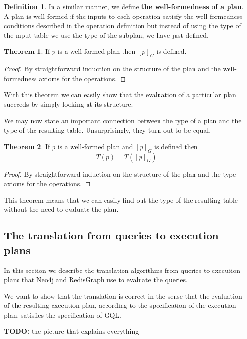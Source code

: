 \documentclass[14pt]{constructor-thesis}
\theoremstyle{definition}
\newtheorem{theorem}{Theorem}
\newtheorem{definition}{Definition}
\newcommand{\todo}[1]{
  \begin{tcolorbox}[colframe=red!75!black,colback=red!5!white,arc=0pt,fonttitle=\bfseries]
  \textbf{TODO:} #1
  \end{tcolorbox}
}
\begin{document}
\begin{definition}
  In a similar manner, we define \textbf{the well-formedness of a plan}. A plan is well-formed if the inputs to each operation satisfy the well-formedness conditions described in the operation definition but instead of using the type of the input table we use the type of the subplan, we have just defined.
\end{definition}

\begin{theorem}
  If $p$ is a well-formed plan then $[p]_G$ is defined.
\end{theorem}
\begin{proof}
  By straightforward induction on the structure of the plan and the well-formedness axioms for the operations.
\end{proof}

With this theorem we can easily show that the evaluation of a particular plan succeeds by simply looking at its structure.

We may now state an important connection between the type of a plan and the type of the resulting table. Unsurprisingly, they turn out to be equal.

\begin{theorem}
  If $p$ is a well-formed plan and $[p]_G$ is defined then
  $$T(p) = T([p]_G)$$
\end{theorem}
\begin{proof}
  By straightforward induction on the structure of the plan and the type axioms for the operations.
\end{proof}

This theorem means that we can easily find out the type of the resulting table without the need to evaluate the plan.

\subsection{The translation from queries to execution plans}

In this section we describe the translation algorithms from queries to execution plans that Neo4j and RedisGraph use to evaluate the queries.

We want to show that the translation is correct in the sense that the evaluation of the resulting execution plan, according to the specification of the execution plan, satisfies the specification of GQL.

\todo{the picture that explains everything}
\end{document}
